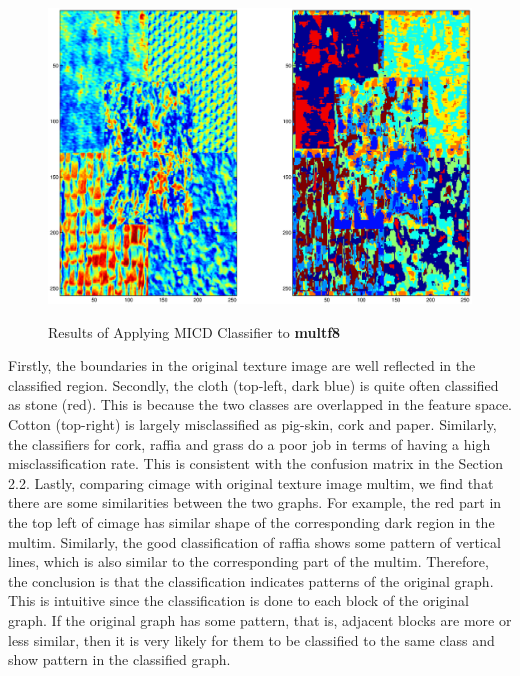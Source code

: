 \begin{figure}\includegraphics[width=\textwidth]{images/image-class}\label{fig:image-class}\caption{Results of Applying MICD Classifier to \textbf{multf8}}\end{figure}Firstly, the boundaries in the original texture image are well reflected in the classified region. 
Secondly, the cloth (top-left, dark blue) is quite often classified as stone (red). This is because the two classes are overlapped in the feature space. Cotton (top-right) is largely misclassified as pig-skin, cork and paper. Similarly, the classifiers for cork, raffia and grass do a poor job in terms of having a high misclassification rate. This is consistent with the confusion matrix in the Section 2.2.
Lastly, comparing cimage with original texture image multim, we find that there are some similarities between the two graphs. For example, the red part in the top left of cimage has similar shape of the corresponding dark region in the multim. Similarly, the good classification of raffia shows some pattern of vertical lines, which is also similar to the corresponding part of the multim. Therefore, the conclusion is that the classification indicates patterns of the original graph. This is intuitive since the classification is done to each block of the original graph. If the original graph has some pattern, that is, adjacent blocks are more or less similar, then it is very likely for them to be classified to the same class and show pattern in the classified graph.